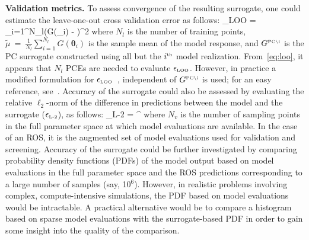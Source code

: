 \textbf{Validation metrics.}
To assess convergence of the resulting surrogate, one could estimate the
leave-one-out cross validation error as follows:
\be
\epsilon_{\mbox{\tiny LOO}} = 
{\sum\limits_{i=1}^{N_l}\left(G(\bm{\theta}_i) - \widetilde{\mu}\right)^2}
\label{eq:loo}
\ee
where $N_l$ is the number of training points,
$\widetilde{\mu}~=~\frac{1}{N_l}\sum\limits_{i=1}^{N_l} G(\bm{\theta}_i)$ is
the sample mean of the model response, and $ G^{\mbox{\tiny {PC}\textbackslash
i}}$ is the PC surrogate constructed using all but the $i^{\mbox{\tiny{th}}}$
model realization.  From~\eqref{eq:loo}, it appears that $N_l$ PCEs are needed
to evaluate $\epsilon_{\mbox{\tiny LOO}}$.  However, in practice a modified
formulation for $\epsilon_{\mbox{\tiny LOO}}$~\cite{Blatman:2009}, independent
of $G^{\mbox{\tiny {PC}\textbackslash i}}$ is used; for an easy reference,
see~\cite[Eq.~(1.27)]{Marelli:2014}.  Accuracy of the surrogate could also 
be assessed by evaluating the relative $\ell_2$-norm of the difference in
predictions between the model and the surrogate ($\epsilon_{\mbox{\tiny{L-2}}}$), as follows:
\be
\epsilon_{\mbox{\tiny{L-2}}} = 
{\left[\sum\limits_{i=1}^{N_v}\left(G(\bm{\theta}_i)\right)^2\right]^{}}
\label{eq:l2}
\ee
where $N_v$ is the number of sampling points in the full parameter space at
which model evaluations are available. In the case of an ROS, it is the
augmented set of model evaluations used for validation and screening.  
%
Accuracy of the surrogate could be further investigated by comparing
probability density functions (PDFs) of the model output based on model
evaluations in the full parameter space and the ROS predictions corresponding
to a large number of samples (say, 10$^6$).  However, in realistic problems
involving complex, compute-intensive simulations, the PDF based on model
evaluations would be intractable.  A practical alternative would be to compare
a histogram based on sparse model evaluations with the surrogate-based PDF in
order to gain some insight into the quality of the comparison. 

